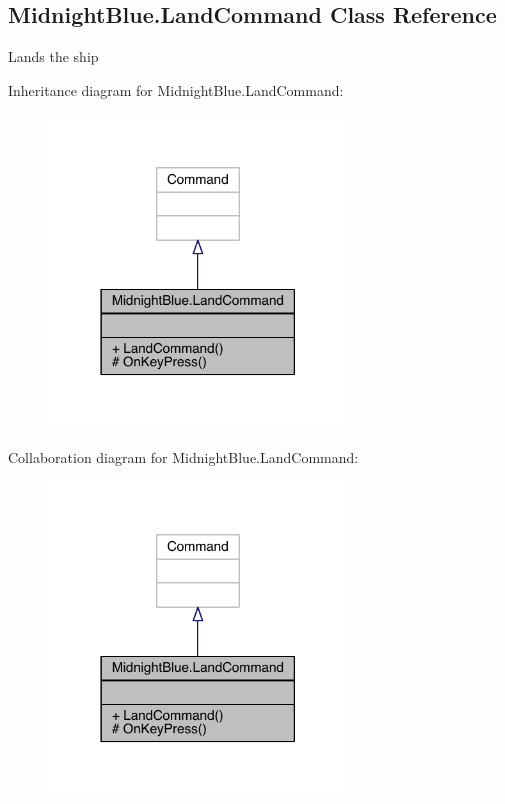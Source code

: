 \hypertarget{class_midnight_blue_1_1_land_command}{}\subsection{Midnight\+Blue.\+Land\+Command Class Reference}
\label{class_midnight_blue_1_1_land_command}


Lands the ship  




Inheritance diagram for Midnight\+Blue.\+Land\+Command\+:\nopagebreak
\begin{figure}[H]
\begin{center}
\leavevmode
\includegraphics[width=225pt]{class_midnight_blue_1_1_land_command__inherit__graph}
\end{center}
\end{figure}


Collaboration diagram for Midnight\+Blue.\+Land\+Command\+:\nopagebreak
\begin{figure}[H]
\begin{center}
\leavevmode
\includegraphics[width=225pt]{class_midnight_blue_1_1_land_command__coll__graph}
\end{center}
\end{figure}
